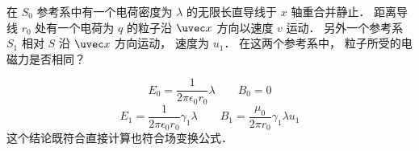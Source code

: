
\begin{issues}
\issueDraft
\end{issues}


在 $S_0$ 参考系中有一个电荷密度为 $\lambda$ 的无限长直导线于 $x$ 轴重合并静止． 距离导线 $r_0$ 处有一个电荷为 $q$ 的粒子沿 $\uvec x$ 方向以速度 $v$ 运动． 另外一个参考系 $S_1$ 相对 $S$ 沿 $\uvec x$ 方向运动， 速度为 $u_1$． 在这两个参考系中， 粒子所受的电磁力是否相同？

\begin{equation}
E_0 = \frac{1}{2\pi\epsilon_0 r_0} \lambda
\qquad
B_0 = 0
\end{equation}
\begin{equation}
E_1 = \frac{1}{2\pi\epsilon_0 r_0} \gamma_1 \lambda
\qquad
B_1 = \frac{\mu_0}{2\pi r_0}\gamma_1 \lambda u_1
\end{equation}
这个结论既符合直接计算也符合场变换公式．
